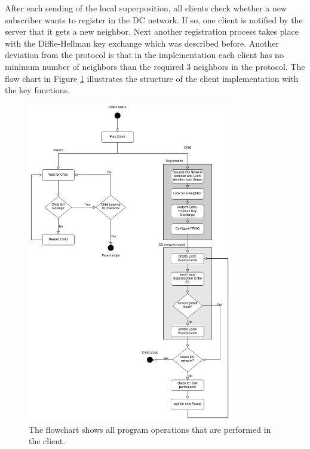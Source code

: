 After each sending of the local superposition, all clients check whether a new subscriber wants to register in the DC network. If so, one client is notified by the server that it gets a new neighbor. Next another registration process takes place with the Diffie-Hellman key exchange which was described before. Another deviation from the protocol is that in the implementation each client has no minimum number of neighbors than the required 3 neighbors in the protocol. The flow chart in Figure \ref{fig:Client Implementation} illustrates the structure of the client implementation with the key functions.
\begin{figure}[tbp]
  \centering
  \includegraphics[width=0.8\textwidth]{images/Client_structure.png}
  \caption[Flowchart Client Implementatioen]{The flowchart shows all program operations that are performed in the client.}
  \label{fig:Client Implementation}
\end{figure}

